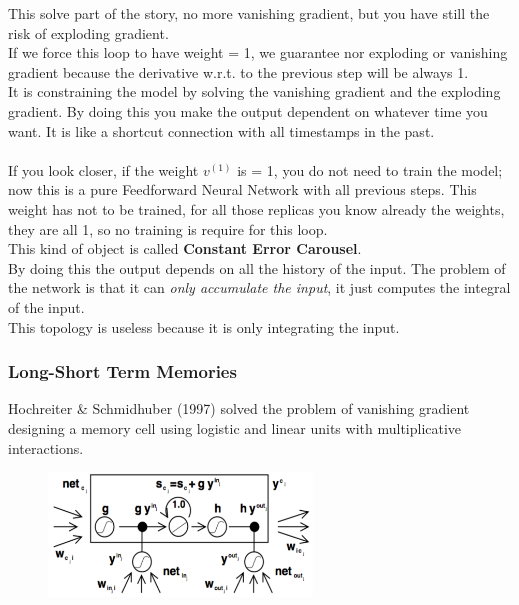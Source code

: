 This solve part of the story, no more vanishing gradient, but you have still the risk of exploding gradient. \\
If we force this loop to have weight = 1, we guarantee nor exploding or vanishing gradient because the derivative w.r.t. to the previous step will be always 1.\\
It is constraining the model by solving the vanishing gradient and the exploding gradient. By doing this you make the output dependent on whatever time you want. It is like a shortcut connection with all timestamps in the past.\\ \\
If you look closer, if the weight $v^{(1)}$ is = 1, you do not need to train the model; now this is a pure Feedforward Neural Network with all previous steps. This weight has not to be trained, for all those replicas you know already the weights, they are all 1, so no training is require for this loop.\\
This kind of object is called \textbf{Constant Error Carousel}.\\ By doing this the output depends on all the history of the input. The problem of the network is that it can \textit{only accumulate the input}, it just computes the integral of the input. \\This topology is useless because it is only integrating the input. 

\subsubsection{Long-Short Term Memories}
Hochreiter \& Schmidhuber (1997) solved the problem of vanishing gradient designing a memory cell using logistic and linear units with multiplicative interactions. \\

\begin{figure}
    \includegraphics[width=7cm]{images/lstm_original.png}
\end{figure} 

